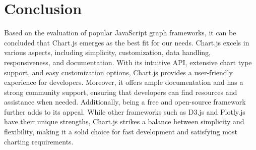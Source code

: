 \documentclass[a4paper, 11pt]{article}
\begin{document}
\section{Conclusion}

Based on the evaluation of popular JavaScript graph frameworks, it can be concluded that Chart.js emerges as the best fit for our needs. Chart.js excels in various aspects, including simplicity, customization, data handling, responsiveness, and documentation. With its intuitive API, extensive chart type support, and easy customization options, Chart.js provides a user-friendly experience for developers. Moreover, it offers ample documentation and has a strong community support, ensuring that developers can find resources and assistance when needed. Additionally, being a free and open-source framework further adds to its appeal. While other frameworks such as D3.js and Plotly.js have their unique strengths, Chart.js strikes a balance between simplicity and flexibility, making it a solid choice for fast development and satisfying most charting requirements.
\end{document}
